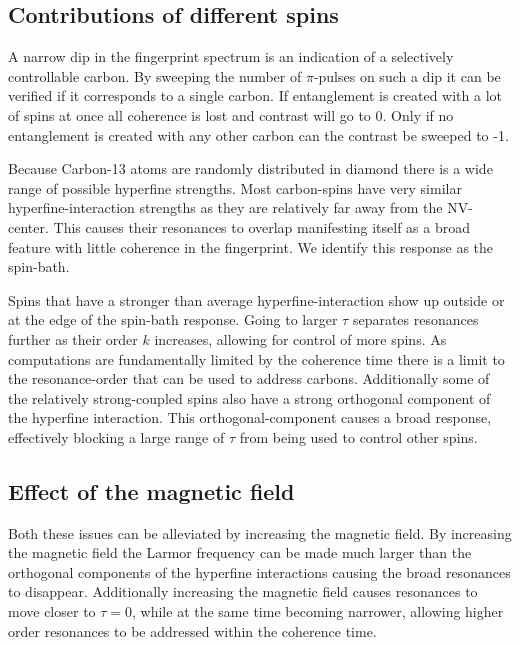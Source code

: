 \subsection*{Contributions of different spins }%

A narrow dip in the fingerprint spectrum is an indication of a selectively controllable carbon.
By sweeping the number of $\pi$-pulses on such a dip it can be verified if it corresponds to a single carbon. If entanglement is created with a lot of spins at once all coherence is lost and contrast will go to 0. Only if no entanglement is created with any other carbon can the contrast be sweeped to -1. %

Because Carbon-13 atoms are randomly distributed in diamond there is a wide range of possible hyperfine strengths.
Most carbon-spins have very similar hyperfine-interaction strengths as they are relatively far away from the NV-center. This causes their resonances to overlap manifesting itself as a broad feature with little coherence in the fingerprint. We identify this response as the spin-bath.

Spins that have a stronger than average hyperfine-interaction show up outside or at the edge of the spin-bath response. Going to larger $\tau$ separates resonances further as their order $k$ increases, allowing for control of more spins.
 As computations are fundamentally limited by the coherence time there is a limit to the resonance-order that can be used to address carbons.
 Additionally some of the relatively strong-coupled spins also have a strong orthogonal component of the hyperfine interaction. This orthogonal-component causes a broad response, effectively blocking a large range of $\tau$ from being used to control other spins.

\subsection*{Effect of the magnetic field}
Both these issues can be alleviated by increasing the magnetic field.
By increasing the magnetic field the Larmor frequency can be made much larger than the orthogonal components of the hyperfine interactions causing the broad resonances to disappear.
Additionally increasing the magnetic field causes resonances to move closer to $\tau =0$, while at the same time becoming narrower, allowing higher order resonances to be addressed within the coherence time. %

